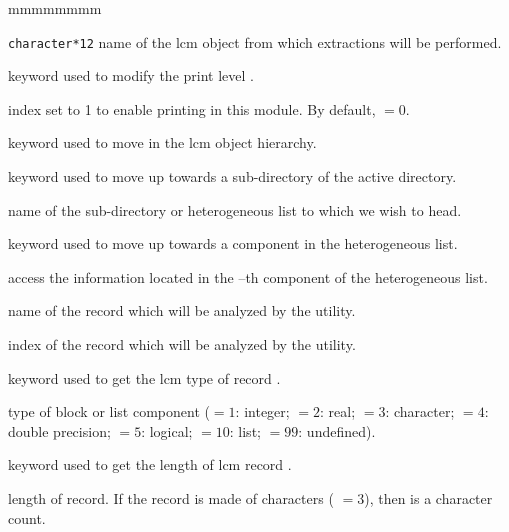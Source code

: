 \begin{ListeDeDescription}{mmmmmmmm}

\item[\dusa{NAME3}] {\tt character*12} name of the {\sc lcm} object from which
extractions will be performed.

\item[\moc{EDIT}] keyword used to modify the print level .

\item[\dusa{iprint}] index set to 1 to enable printing in this module. By default,  $=0$.

\item[\moc{STEP}] keyword used to move in the {\sc lcm} object hierarchy.

\item[\moc{UP}] keyword used to move up towards a sub-directory of the
active directory.

\item[\dusa{NOMDIR}] name of the sub-directory or heterogeneous list to which we wish to head.

\item[\moc{AT}] keyword used to move up towards a component in the heterogeneous list.

\item[\dusa{index}] access the information located in the --th component of the heterogeneous list.

\item[\dusa{BLOCK}] name of the record which will be analyzed by the
 utility.

\item[\dusa{index}] index of the record which will be analyzed by the
 utility.

\item[\moc{TYPE}] keyword used to get the {\sc lcm} type of record .

\item[\dusa{itype}] type of block  or list component  ($=1$: integer;
$=2$: real; $=3$: character; $=4$: double precision; $=5$: logical; $=10$: list; $=99$: undefined).

\item[\moc{LENGTH}] keyword used to get the length of {\sc lcm} record .

\item[\dusa{ilong}] length of record. If the record is made of characters ( $=3$),
then  is a character count.


\end{ListeDeDescription}
